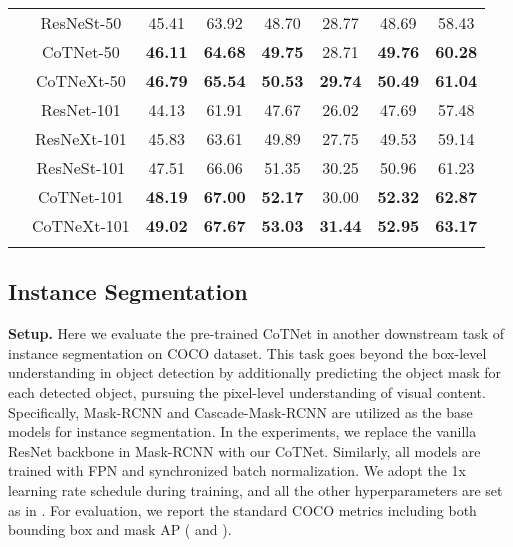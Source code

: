 \documentclass[10pt,twocolumn,letterpaper]{article}
\begin{document}
\begin{table}[!tb]
\begin{tabular}{c|c|ccc|ccc}
        & ResNeSt-50 \cite{zhang2020resnest}  & 45.41  & 63.92     & 48.70     & 28.77    & 48.69  & 58.43      \\
        & CoTNet-50   & \textbf{46.11}  & \textbf{64.68}     & \textbf{49.75}  & 28.71    & \textbf{49.76}  & \textbf{60.28}       \\
        & CoTNeXt-50  & \textbf{46.79}  & \textbf{65.54}     & \textbf{50.53}  & \textbf{29.74}    & \textbf{50.49}  & \textbf{61.04}       \\ \cline{2-8}
        & ResNet-101 \cite{he2016deep}        & 44.13  & 61.91     & 47.67     & 26.02    & 47.69  & 57.48       \\
        & ResNeXt-101 \cite{xie2017aggregated} & 45.83 & 63.61     & 49.89     & 27.75    & 49.53  & 59.14       \\
        & ResNeSt-101 \cite{zhang2020resnest} & 47.51  & 66.06     & 51.35     & 30.25    & 50.96  & 61.23       \\
        & CoTNet-101  & \textbf{48.19}  & \textbf{67.00}     & \textbf{52.17}  & 30.00    & \textbf{52.32}  & \textbf{62.87}       \\
        & CoTNeXt-101 & \textbf{49.02}  & \textbf{67.67}     & \textbf{53.03}  & \textbf{31.44}    & \textbf{52.95}  & \textbf{63.17} \\
\Xhline{2\arrayrulewidth}
\end{tabular}
\vspace{-0.22in}
\label{table:od}
\end{table}



\subsection{Instance Segmentation}

\textbf{Setup.} Here we evaluate the pre-trained CoTNet in another downstream task of instance segmentation on COCO dataset. This task goes beyond the box-level understanding in object detection by additionally predicting the object mask for each detected object, pursuing the pixel-level understanding of visual content. Specifically, Mask-RCNN \cite{he2017mask,he2018mask} and Cascade-Mask-RCNN \cite{cai2018cascade} are utilized as the base models for instance segmentation. In the experiments, we replace the vanilla ResNet backbone in Mask-RCNN with our CoTNet. Similarly, all models are trained with FPN and synchronized batch normalization. We adopt the 1x learning rate schedule during training, and all the other hyperparameters are set as in \cite{zhang2020resnest}. For evaluation, we report the standard COCO metrics including both bounding box and mask AP ( and ).
\end{document}
